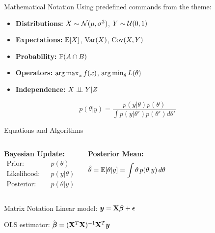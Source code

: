 \documentclass[aspectratio=169]{beamer}
\begin{document}
\begin{frame}{Mathematical Notation}
  Using predefined commands from the theme:

  \begin{itemize}
    \item \textbf{Distributions:} $X \sim \mathcal{N}(\mu, \sigma^2)$, $Y \sim \mathcal{U}(0, 1)$
    \item \textbf{Expectations:} $\mathbb{E}[X]$, $\operatorname{Var}(X)$, $\operatorname{Cov}(X, Y)$
    \item \textbf{Probability:} $\mathbb{P}(A \cap B)$
    \item \textbf{Operators:} $\operatorname*{arg\,max}_{x} f(x)$, $\operatorname*{arg\,min}_{\theta} L(\theta)$
    \item \textbf{Independence:} $X \perp\!\!\!\perp Y | Z$
  \end{itemize}

  \vspace{1em}

  \begin{equation}
    p(\theta | y) = \frac{p(y | \theta) p(\theta)}{\int p(y | \theta') p(\theta') d\theta'}
  \end{equation}
\end{frame}

\begin{frame}{Equations and Algorithms}
  \begin{columns}
    \textbf{Bayesian Update:}
    \begin{align*}
      \text{Prior:} && p(\theta) \\
      \text{Likelihood:} && p(y | \theta) \\
      \text{Posterior:} && p(\theta | y)
    \end{align*}

    \textbf{Posterior Mean:}
    \begin{equation*}
      \hat{\theta} = \mathbb{E}[\theta | y] = \int \theta \, p(\theta | y) \, d\theta
    \end{equation*}
  \end{columns}

  \vspace{1em}

  \begin{block}{Matrix Notation}
    Linear model: $\boldsymbol{y} = \mathbf{X}\boldsymbol{\beta} + \boldsymbol{\epsilon}$

    OLS estimator: $\hat{\boldsymbol{\beta}} = (\mathbf{X}^T\mathbf{X})^{-1}\mathbf{X}^T\boldsymbol{y}$
  \end{block}
\end{frame}
\end{document}
